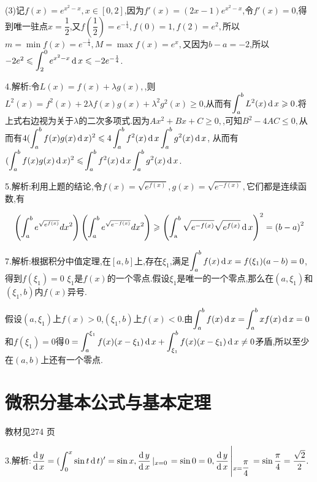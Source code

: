 (3)记$f\left( x \right) = {e^{{x^2} - x}},x \in \left[ {0,2} \right]$,因为$f'\left( x \right) = \left( {2x - 1} \right){e^{{x^2} - x}}$,令$f'\left( x \right) = 0$,得到唯一驻点$x = \dfrac{1}{2}$,又$f\left( {\dfrac{1}{2}} \right) = {e^{ - \frac{1}{4}}},f\left( 0 \right) = 1,f\left( 2\right) = {e^2},$所以$m = \min f\left( x \right) = {e^{ - \frac{1}{4}}},M = \max f\left( x \right) = {e^x},$又因为$b - a = -2$,所以$ - 2{e^2} \leqslant {\displaystyle\int_2^0 e ^{{x^2} - x}}\operatorname{\mathop{}\!\mathrm{d}} x \leqslant  - 2{e^{ - \frac{1}{4}}}$.

4.解析:令$L\left( x \right) = f\left( x \right) + \lambda g\left( x \right),$,则${L^2}\left( x \right) = {f^2}\left( x \right) + 2\lambda f\left( x \right)g\left( x \right) + {\lambda ^2}{g^2}\left( x \right) \geqslant 0$,从而有$\displaystyle\int_a^b {{L^2}(x)} \operatorname{\mathop{}\!\mathrm{d}} x \geqslant 0$.将上式右边视为关于$\lambda $的二次多项式.因为$A{x^2} + Bx + C \geqslant 0,$,可知${B^2} - 4AC \leqslant 0,$从而有$4(\displaystyle\int_a^b {f(x)g(x)\operatorname{\mathop{}\!\mathrm{d}} x{)^2} \leqslant 4} \displaystyle\int_a^b {{f^2}(x)\operatorname{\mathop{}\!\mathrm{d}} x} \displaystyle\int_a^b {{g^2}(x)\operatorname{\mathop{}\!\mathrm{d}} x} $,
从而有$(\displaystyle\int_a^b {f(x)g(x)\operatorname{\mathop{}\!\mathrm{d}} x{)^2} \leqslant } \displaystyle\int_a^b {{f^2}(x)\operatorname{\mathop{}\!\mathrm{d}} x} \displaystyle\int_a^b {{g^2}(x)\operatorname{\mathop{}\!\mathrm{d}} x} $.

5.解析:利用上题的结论,令$f\left( x \right) = \sqrt {{e^{f\left( x \right)}}} ,g\left( x \right) = \sqrt {{e^{ - f\left( x \right)}}} ,$它们都是连续函数,有

\[\left( {\displaystyle\int_a^b {{e^{\sqrt {{e^{f(x)}}} }}} d{x^2}} \right)\left( {\displaystyle\int_a^b {{e^{\sqrt {{e^{ - f(x)}}} }}} d{x^2}} \right) \geqslant {\left( {\displaystyle\int_{\text{a}}^b {\sqrt {{e^{ - f(x)}}} } \sqrt {{e^{f(x)}}} \operatorname{\mathop{}\!\mathrm{d}}x} \right)^2} = {\left( {b - a} \right)^2}\]

7.解析:根据积分中值定理,在$[a,b]$上,存在${\xi _1}$,满足$\displaystyle\int_a^b {f(x)\operatorname{\mathop{}\!\mathrm{d}} x}  = f({\xi _1})(a - b) = 0$,得到$f({\xi _1}) = 0$
${\xi _1}$是$f(x)$的一个零点.假设${\xi _1}$是唯一的一个零点,那么在$(a,{\xi _1})$和$({\xi _1},b)$内$f(x)$异号.

假设$(a,{\xi _1})$上$f(x) > 0$,$({\xi _1},b)$上$f(x) < 0$.由$\displaystyle\int_a^b {f(x)\operatorname{\mathop{}\!\mathrm{d}} x = } \displaystyle\int_a^b {xf(x)\operatorname{\mathop{}\!\mathrm{d}} x}  = 0$和$f({\xi _1}) = 0$得$0 = \displaystyle\int_a^{{\xi _1}} {f(x)(x - {\xi _1})\operatorname{\mathop{}\!\mathrm{d}} x}  + \displaystyle\int_{{\xi _1}}^b {f(x)(x - {\xi _1})\operatorname{\mathop{}\!\mathrm{d}} x \ne 0} $矛盾,所以至少在$(a,b)$上还有一个零点.


\section{微积分基本公式与基本定理}
\begin{flushright}
  \color{zhanqing!80}
   教材见274 页 %
\end{flushright}
3.解析:$\dfrac{{\operatorname{\mathop{}\!\mathrm{d}} y}}{{\operatorname{\mathop{}\!\mathrm{d}} x}} = (\displaystyle\int_0^x {\sin t\operatorname{\mathop{}\!\mathrm{d}} t} )' = \sin x,\dfrac{{\operatorname{\mathop{}\!\mathrm{d}} y}}{{\operatorname{\mathop{}\!\mathrm{d}} x}}\left| {_{x = 0}} \right. = \sin 0 = 0,\dfrac{{\operatorname{\mathop{}\!\mathrm{d}} y}}{{\operatorname{\mathop{}\!\mathrm{d}} x}}\left| {_{x = \dfrac{\pi }{4}}} \right. = \sin \dfrac{\pi }{4} = \dfrac{{\sqrt 2 }}{2}.$

